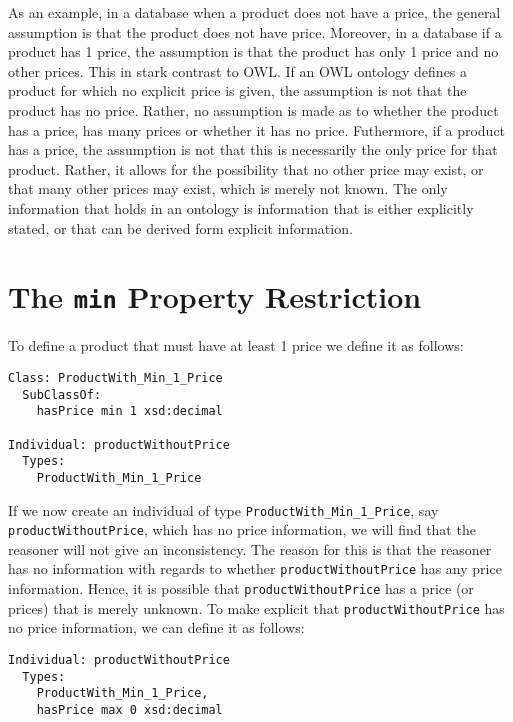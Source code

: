 \documentclass{amsart}
\begin{document}
As an example, in a database when a product does not have a price, the general assumption is that the product does not have price. Moreover, in a database if a product has 1 price, the assumption is that the product has only 1 price and no other prices. This in stark contrast to OWL. If an OWL ontology defines a product for which no explicit price is given, the assumption is not that the product has no price. Rather, no assumption is made as to whether the product has a price, has many prices or whether it has no price. Futhermore, if a product has a price, the assumption is not that this is necessarily the only price for that product. Rather, it allows for the possibility that no other price may exist, or that many other prices may exist, which is merely not known. The only information that holds in an ontology is information that is either explicitly stated, or that can be derived form explicit information.
  
  \section{The \texttt{min} Property Restriction}
  To define a product that must have at least 1 price we define it as follows:
\begin{small}
	\begin{verbatim} 
Class: ProductWith_Min_1_Price
  SubClassOf: 
    hasPrice min 1 xsd:decimal
  
Individual: productWithoutPrice
  Types:  
    ProductWith_Min_1_Price
  	\end{verbatim}
\end{small}  
If we now create an individual of type \texttt{ProductWith\_Min\_1\_Price}, say \texttt{productWithoutPrice}, which has no price information, we will find that the reasoner will not give an inconsistency. The reason for this is that the reasoner has no information with regards to whether \texttt{productWithoutPrice} has any price information. Hence, it is possible that \texttt{productWithoutPrice} has a price (or prices) that is merely unknown. To make explicit that \texttt{productWithoutPrice} has no price information, we can define it as follows:

\begin{small}
\begin{verbatim} 
Individual: productWithoutPrice
  Types:  
    ProductWith_Min_1_Price,
    hasPrice max 0 xsd:decimal    
\end{verbatim}
\end{small}
\end{document}
